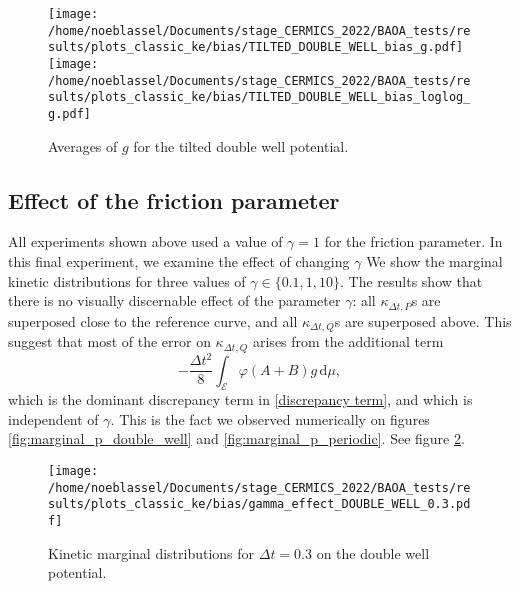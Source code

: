 \begin{figure}[htbp]
  \begin{center}
    \texttt{[image: /home/noeblassel/Documents/stage\_CERMICS\_2022/BAOA\_tests/results/plots\_classic\_ke/bias/TILTED\_DOUBLE\_WELL\_bias\_g.pdf]}
    \texttt{[image: /home/noeblassel/Documents/stage\_CERMICS\_2022/BAOA\_tests/results/plots\_classic\_ke/bias/TILTED\_DOUBLE\_WELL\_bias\_loglog\_g.pdf]}
    \caption{ \label{fig:tilted_double_well_bias}
      Averages of $g$ for the tilted double well potential.
    }
  \end{center}
\end{figure}


\subsection{Effect of the friction parameter}\label{gamma does not count}
All experiments shown above used a value of $\gamma=1$ for the friction parameter. In this final experiment, we examine the effect of changing $\gamma$
We show the marginal kinetic distributions for three values of $\gamma\in \{0.1,1,10\}$.
The results show that there is no visually discernable effect of the parameter $\gamma$: all $\kappa_{\Delta t,P}$s are superposed close to the reference curve, and all $\kappa_{\Delta t,Q}$s are superposed above. This suggest that most of the error on $\kappa_{\Delta t,Q}$ arises from the additional term
$$-\frac{\Delta t^2}8\int_{\mathcal E} \varphi (A+B)g\, \mathrm{d}\mu,$$
which is the dominant discrepancy term in \eqref{discrepancy term}, and which is independent of $\gamma$. This is the fact we observed numerically on figures \ref{fig:marginal_p_double_well} and \ref{fig:marginal_p_periodic}.
See figure \ref{fig:gamma_effect}.

\begin{figure}[htbp]
  \begin{center}
    \texttt{[image: /home/noeblassel/Documents/stage\_CERMICS\_2022/BAOA\_tests/results/plots\_classic\_ke/bias/gamma\_effect\_DOUBLE\_WELL\_0.3.pdf]}
    \caption{ \label{fig:gamma_effect}
      Kinetic marginal distributions for $\Delta t=0.3$ on the double well potential.
    }
  \end{center}
\end{figure}